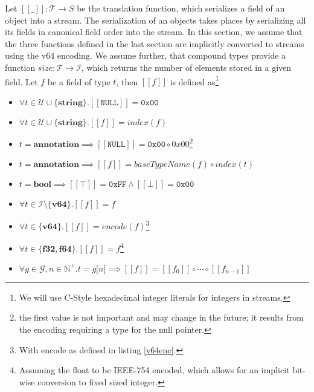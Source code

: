 \documentclass[a4paper,10pt]{article}
\newcommand{\den}[1]{[\![#1]\!]}
\begin{document}
Let $\den{\_}:\mathcal{T} → S$ be the translation function, which serializes a field of an object into a stream. The serialization of an objects takes places by serializing all its fields in canonical field order into the stream. In this section, we assume that the three functions defined in the last section are implicitly converted to streams using the v64 encoding. We assume further, that compound types provide a function $size: \mathcal{T} → \mathcal{I}$, which returns the number of elements stored in a given field.
Let $f$ be a field of type $t$, then $\den{f}$ is defined as\footnote{We will use C-Style hexadecimal integer literals for integers in streams.}
\begin{itemize}
 \item $\forall t \in \mathcal{U}\cup\{\textbf{string}\}. \den{\texttt{NULL}} = \texttt{0x00}$
 \item $\forall t \in \mathcal{U}\cup\{\textbf{string}\}. \den{f} = index(f)$
 
 \item $t=\textbf{annotation} \implies \den{\texttt{NULL}} = \texttt{0x00} \circ 0x00$\footnote{the first value is not important and may change in the future; it results from the encoding requiring a type for the null pointer.}
 \item $t=\textbf{annotation} \implies \den{f} = baseTypeName(f) \circ index(t)$
 
 \item $t=\textbf{bool} \implies \den{\top} = \texttt{0xFF} \wedge \den{\bot} = \texttt{0x00}$
 
 \item $\forall t \in \mathcal{I}\setminus\{\textbf{v64}\}. \den{f} = f$
 
 \item $\forall t \in \{\textbf{v64}\}. \den{f} = encode(f)$\footnote{With encode as defined in listing \ref{v64enc}.}
 
 \item $\forall t \in \{\textbf{f32},\textbf{f64}\}. \den{f} = f$\footnote{Assuming the float to be IEEE-754 encoded, which allows for an implicit bit-wise conversion to fixed sized integer.}
 
 \item $\forall g \in \mathcal{G}, n \in \mathbb{N}^+. t = g\texttt{[}n\texttt{]} \implies \den{f} = \den{f_0} \circ \cdots \circ \den{f_{n-1}}$
 

\end{itemize}
\end{document}
